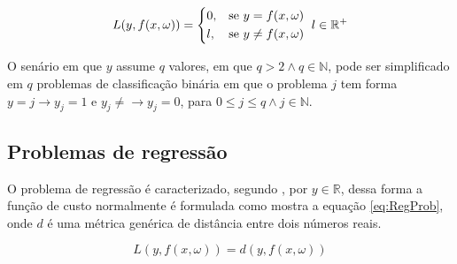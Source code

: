 \begin{equation}
{	
	 L(y, f(x, \omega)) = \begin{dcases*}
	0,  & se $y = f(x, \omega)$ \\
	l,  & se $y \ne f(x, \omega)$ 
	\end{dcases*} \\ 
	l \in \mathbb {R^+}
}
\label{eq:ClassProb}
\end{equation}

O senário em que $y$ assume $q$ valores, em que $q > 2 \land q \in \mathbb {N}$, pode ser simplificado em $q$ problemas de classificação binária em que o problema $j$ tem forma $y = j \rightarrow y_j = 1$ e $y_j \neq  \rightarrow y_j = 0 $, para $ 0 \leq j \leq q \land j \in \mathbb {N}$.

\subsection{Problemas de regressão}
O problema de regressão é caracterizado, segundo , por $y \in \mathbb {R}$, dessa forma a função de custo normalmente é formulada como mostra a equação \ref{eq:RegProb}, onde $d$ é uma métrica genérica de distância entre dois números reais.

\begin{equation}
L(y, f(x, \omega)) = d(y, f(x, \omega))
\label{eq:RegProb}
\end{equation}

